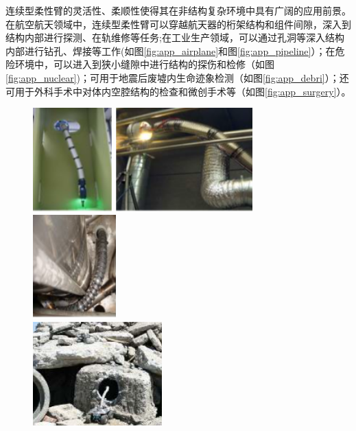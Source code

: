 连续型柔性臂的灵活性、柔顺性使得其在非结构复杂环境中具有广阔的应用前景。在航空航天领域中，连续型柔性臂可以穿越航天器的桁架结构和组件间隙，深入到结构内部进行探测、在轨维修等任务\cite{xu_modified_2017};在工业生产领域，可以通过孔洞等深入结构内部进行钻孔、焊接等工作(如图\ref{fig:app_airplane}和图\ref{fig:app_pipeline}）；在危险环境中，可以进入到狭小缝隙中进行结构的探伤和检修（如图\ref{fig:app_nuclear})；可用于地震后废墟内生命迹象检测（如图\ref{fig:app_debri}）；还可用于外科手术中对体内空腔结构的检查和微创手术等（如图\ref{fig:app_surgery}）。
\begin{figure}[h]
	\centering%
	{\includegraphics[height=4cm]{figures/app_airplane.png}}%
	\hspace{1em}%
	{\includegraphics[height=4cm]{figures/app_pipeline.png}}
	\hspace{1em}%
	{\includegraphics[height=4cm]{figures/app_nuclear.png}}
	\\
	\vspace{1em}
	{\includegraphics[height=4cm]{figures/app_debri.png}}

\end{figure}

